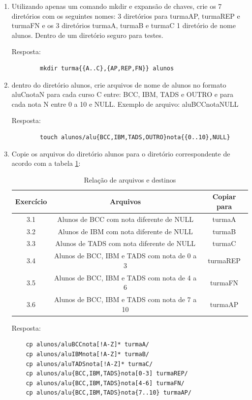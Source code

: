 	\begin{enumerate}
		\item Utilizando apenas um comando mkdir e expansão de chaves, crie os 7 diretórios com os seguintes nomes: 3 diretórios para turmaAP, turmaREP e turmaFN e os 3 diretórios turmaA, turmaB e turmaC 1 diretório de nome alunos. Dentro de um diretório seguro para testes.
		
		Resposta:
		\begin{lstlisting}
		mkdir turma{{A..C},{AP,REP,FN}} alunos
		\end{lstlisting}
		\item dentro do diretório alunos, crie arquivos de nome de alunos no formato aluCnotaN para cada curso C entre: BCC, IBM, TADS e OUTRO e para cada nota N entre 0 a 10 e NULL. Exemplo de arquivo: aluBCCnotaNULL
		
		Resposta:
		\begin{lstlisting}
		touch alunos/alu{BCC,IBM,TADS,OUTRO}nota{{0..10},NULL}
		\end{lstlisting}
		\item Copie os arquivos do diretório alunos para o diretório correspondente de acordo com a tabela \ref{table:4}:
		
			\begin{table}[!ht]
			\centering
			\begin{tabular}{ | c | c | c | } 
				\hline
				\bfseries Exercício & \bfseries Arquivos & \bfseries Copiar para \\
				\hline
				3.1 & Alunos de BCC com nota diferente de NULL & turmaA \\
				\hline
				3.2 & Alunos de IBM com nota diferente de NULL & turmaB \\
				\hline
				3.3 & Alunos de TADS com nota diferente de NULL & turmaC \\
				\hline
				3.4 & Alunos de BCC, IBM e TADS com nota de 0 a 3 & turmaREP \\
				\hline
				3.5 & Alunos de BCC, IBM e TADS com nota de 4 a 6 & turmaFN \\
				\hline
				3.6 & Alunos de BCC, IBM e TADS com nota de 7 a 10 & turmaAP \\
				\hline
			\end{tabular}
			\caption{Relação de arquivos e destinos}
			\label{table:4}
		\end{table}
	Resposta:
	\begin{lstlisting}
	cp alunos/aluBCCnota[!A-Z]* turmaA/
	cp alunos/aluIBMnota[!A-Z]* turmaB/
	cp alunos/aluTADSnota[!A-Z]* turmaC/
	cp alunos/alu{BCC,IBM,TADS}nota[0-3] turmaREP/
	cp alunos/alu{BCC,IBM,TADS}nota[4-6] turmaFN/
	cp alunos/alu{BCC,IBM,TADS}nota{7..10} turmaAP/
	\end{lstlisting}
	\end{enumerate}

